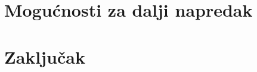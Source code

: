 \documentclass[12pt,oneside]{memoir}
\begin{document}
\chapter{Mogućnosti za dalji napredak}

\chapter{Zaključak}




\backmatter
\end{document}
